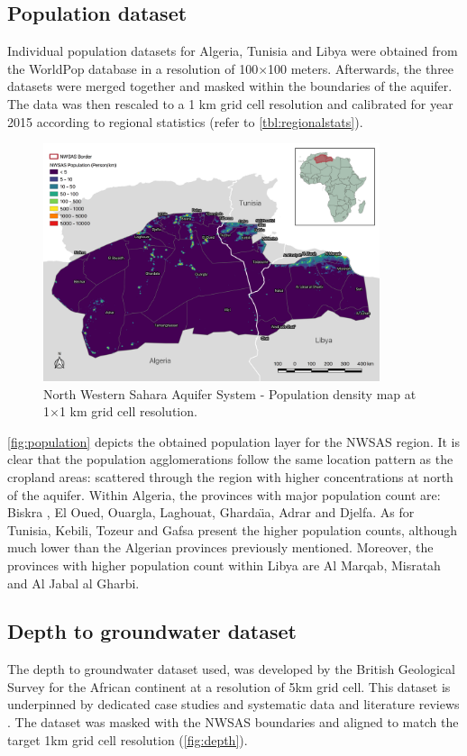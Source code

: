 \documentclass[12pt]{iopart}
\begin{document}
\subsection{Population dataset}
Individual population datasets for Algeria, Tunisia and Libya were obtained from the WorldPop database \cite{Worldpop} in a resolution of 100$\times$100 meters. Afterwards, the three datasets were merged together and masked within the boundaries of the aquifer. The data was then rescaled to a 1 km grid cell resolution and calibrated for year 2015 according to regional statistics (refer to \autoref{tbl:regionalstats}).

\begin{figure}[!ht]
	\centering
	\includegraphics[width=0.88\textwidth, cfbox=black 1pt 0pt]{NWSAS_Population}
	\caption[NWSAS population map]{North Western Sahara Aquifer System - Population density map at 1$\times$1 km grid cell resolution.}
	\label{fig:population}
\end{figure}

\autoref{fig:population} depicts the obtained population layer for the NWSAS region. It is clear that the population agglomerations follow the same location pattern as the cropland areas: scattered through the region with higher concentrations at north of the aquifer. Within Algeria, the provinces with major population count are: Biskra , El Oued, Ouargla, Laghouat, Gharda\"\i a, Adrar and Djelfa. As for Tunisia, Kebili, Tozeur and Gafsa present the higher population counts, although much lower than the Algerian provinces previously mentioned. Moreover, the provinces with higher population count within Libya are Al Marqab, Misratah and Al Jabal al Gharbi.

\vfill
\subsection{Depth to groundwater dataset}
The depth to groundwater dataset used, was developed by the British Geological Survey for the African continent at a resolution of 5km grid cell. This dataset is underpinned by dedicated case studies and systematic data and literature reviews \cite{Quantitativemapsgroundwater2012a}. The dataset was masked with the NWSAS boundaries and aligned to match the target 1km grid cell resolution (\autoref{fig:depth}).
\end{document}
